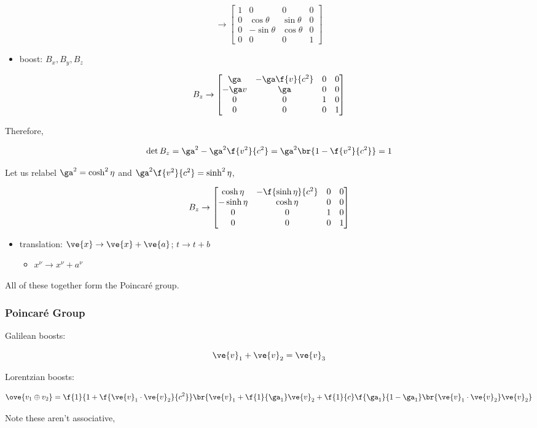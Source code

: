 \documentclass{article}
\newcommand{\mtrx}[1]{
    \begin{bmatrix}
    #1
    \end{bmatrix}
}
\begin{document}
\[ \to \mtrx{1 & 0 & 0 & 0 \\ 0 & \cos \theta & \sin \theta & 0 \\ 0 & -\sin \theta & \cos \theta & 0 \\ 0 & 0 & 0 & 1 } \]

\begin{itemize}
    \item boost: $B_x, B_y, B_z$
\end{itemize}

\[ B_z \to \mtrx{\ga & -\ga\f{v}{c^2} & 0 & 0 \\ -\ga v & \ga & 0 & 0 \\ 0 & 0 & 1 & 0 \\ 0 & 0 & 0 & 1 } \]

Therefore,

\[ \det B_z = \ga^2 - \ga^2 \f{v^2}{c^2} = \ga^2\br{1-\f{v^2}{c^2}} = 1 \]

Let us relabel $\ga^2 = \cosh^2 \eta$ and $\ga^2\f{v^2}{c^2} = \sinh^2 \eta$,

\[ B_z \to \mtrx{\cosh \eta & -\f{\sinh \eta}{c^2} & 0 & 0 \\ -\sinh \eta & \cosh \eta & 0 & 0 \\ 0 & 0 & 1 & 0 \\ 0 & 0 & 0 & 1 } \]

\begin{itemize}
    \item translation: $\ve{x} \to \ve{x} + \ve{a}$; $t \to t + b$
    \begin{itemize}
        \item $x^\nu \to x^\nu + a^\nu$
    \end{itemize}
\end{itemize}

All of these together form the Poincaré group.

\subsubsection{Poincaré Group}

Galilean boosts:

\[ \ve{v}_1 + \ve{v}_2 = \ve{v}_3 \]

Lorentzian boosts:

\[ \ove{v_1 \oplus v_2} = \f{1}{1+\f{\ve{v}_1\cdot\ve{v}_2}{c^2}}\br{\ve{v}_1 + \f{1}{\ga_1}\ve{v}_2 + \f{1}{c}\f{\ga_1}{1-\ga_1}\br{\ve{v}_1\cdot\ve{v}_2} \ve{v}_2}\]

Note these aren't associative,
\end{document}
